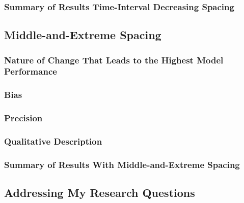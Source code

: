 \documentclass[
12pt, %
twoside,
english]{guelphthesis}
\begin{document}
\hypertarget{summary-of-results-time-interval-decreasing-spacing}{%
\subsubsection{Summary of Results Time-Interval Decreasing Spacing}\label{summary-of-results-time-interval-decreasing-spacing}}

\hypertarget{middle-and-extreme-spacing}{%
\subsection{Middle-and-Extreme Spacing}\label{middle-and-extreme-spacing}}

\hypertarget{nature-change-mid-ext-exp1}{%
\subsubsection{Nature of Change That Leads to the Highest Model Performance}\label{nature-change-mid-ext-exp1}}

\hypertarget{bias-mid-ext-exp1}{%
\subsubsection{Bias}\label{bias-mid-ext-exp1}}

\hypertarget{precision-mid-ext-exp1}{%
\subsubsection{Precision}\label{precision-mid-ext-exp1}}

\hypertarget{qualitative-mid-ext-exp1}{%
\subsubsection{Qualitative Description}\label{qualitative-mid-ext-exp1}}

\hypertarget{summary-of-results-with-middle-and-extreme-spacing}{%
\subsubsection{Summary of Results With Middle-and-Extreme Spacing}\label{summary-of-results-with-middle-and-extreme-spacing}}

\hypertarget{addressing-my-research-questions}{%
\subsection{Addressing My Research Questions}\label{addressing-my-research-questions}}
\end{document}
